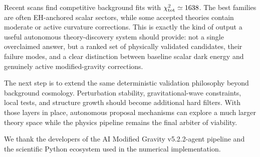 \documentclass[aps,prd,twocolumn,superscriptaddress,nofootinbib,longbibliography]{revtex4-2}
\newcommand{\chiT}{\chi^2_{\rm tot}}
\begin{document}
Recent scans find competitive background fits with $\chiT\simeq1638$.  The best families are often EH-anchored scalar sectors, while some accepted theories contain moderate or active curvature corrections.  This is exactly the kind of output a useful autonomous theory-discovery system should provide: not a single overclaimed answer, but a ranked set of physically validated candidates, their failure modes, and a clear distinction between baseline scalar dark energy and genuinely active modified-gravity corrections.

The next step is to extend the same deterministic validation philosophy beyond background cosmology.  Perturbation stability, gravitational-wave constraints, local tests, and structure growth should become additional hard filters.  With those layers in place, autonomous proposal mechanisms can explore a much larger theory space while the physics pipeline remains the final arbiter of viability.

\begin{acknowledgments}
We thank the developers of the AI Modified Gravity v5.2.2-agent pipeline and the scientific Python ecosystem used in the numerical implementation.
\end{acknowledgments}



\end{document}

